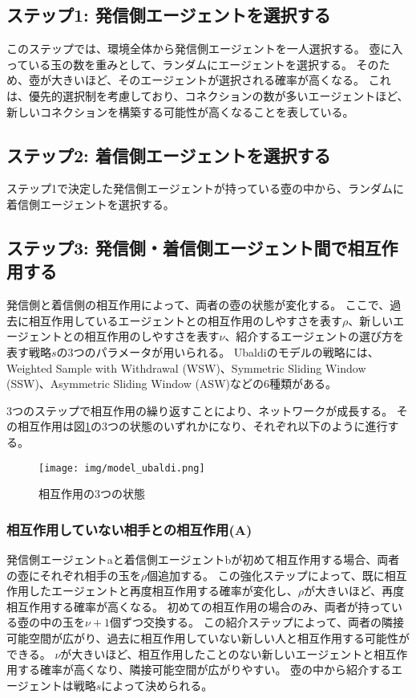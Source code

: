 \documentclass[uplatex,11pt,openany]{ujreport}
\begin{document}
        \subsection*{ステップ1: 発信側エージェントを選択する}
        このステップでは、環境全体から発信側エージェントを一人選択する。
        壺に入っている玉の数を重みとして、ランダムにエージェントを選択する。
        そのため、壺が大きいほど、そのエージェントが選択される確率が高くなる。
        これは、優先的選択制を考慮しており、コネクションの数が多いエージェントほど、新しいコネクションを構築する可能性が高くなることを表している。

        \subsection*{ステップ2: 着信側エージェントを選択する}
        ステップ1で決定した発信側エージェントが持っている壺の中から、ランダムに着信側エージェントを選択する。

        \subsection*{ステップ3: 発信側・着信側エージェント間で相互作用する}
        発信側と着信側の相互作用によって、両者の壺の状態が変化する。
        ここで、過去に相互作用しているエージェントとの相互作用のしやすさを表す$\rho$、新しいエージェントとの相互作用のしやすさを表す$\nu$、紹介するエージェントの選び方を表す戦略$s$の3つのパラメータが用いられる。
        Ubaldiのモデルの戦略には、Weighted Sample with Withdrawal (WSW)、Symmetric Sliding Window (SSW)、Asymmetric Sliding Window (ASW)などの6種類がある。

        3つのステップで相互作用の繰り返すことにより、ネットワークが成長する。
        その相互作用は図\ref{fig:model_ubaldi}の3つの状態のいずれかになり、それぞれ以下のように進行する。
        \begin{figure}[htbp]
            \centering
            \texttt{[image: img/model\_ubaldi.png]}
            \caption{相互作用の3つの状態}
            \label{fig:model_ubaldi}
        \end{figure}


            \subsubsection*{相互作用していない相手との相互作用(A)}
            発信側エージェントaと着信側エージェントbが初めて相互作用する場合、両者の壺にそれぞれ相手の玉を$\rho$個追加する。
            この強化ステップによって、既に相互作用したエージェントと再度相互作用する確率が変化し、$\rho$が大きいほど、再度相互作用する確率が高くなる。
            初めての相互作用の場合のみ、両者が持っている壺の中の玉を$\nu+1$個ずつ交換する。
            この紹介ステップによって、両者の隣接可能空間が広がり、過去に相互作用していない新しい人と相互作用する可能性ができる。
            $\nu$が大きいほど、相互作用したことのない新しいエージェントと相互作用する確率が高くなり、隣接可能空間が広がりやすい。
            壺の中から紹介するエージェントは戦略$s$によって決められる。
\end{document}
